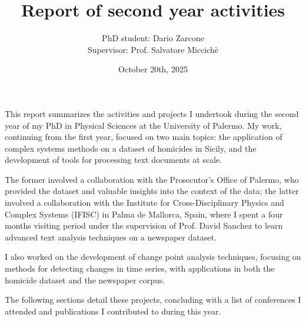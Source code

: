 \documentclass[a4paper, 10pt]{scrartcl}
\title{\LARGE{Report of second year activities}}
\author{\large{PhD student: Dario Zarcone}\\\large{Supervisor: Prof. Salvatore Miccichè}}
\date{\normalsize{October 20th, 2025}}
\begin{document}
\maketitle

This report summarizes the activities and projects I undertook during the second year of my PhD in Physical Sciences at the University of Palermo. My work, continuing from the first year, focused on two main topics: the application of complex systems methods on a dataset of homicides in Sicily, and the development of tools for processing text documents at scale.

The former involved a collaboration with the Prosecutor's Office of Palermo, who provided the dataset and valuable insights into the context of the data; the latter involved a collaboration with the Institute for Cross-Disciplinary Physics and Complex Systems (IFISC) in Palma de Mallorca, Spain, where I spent a four months visiting period under the supervision of Prof. David Sanchez to learn advanced text analysis techniques on a newspaper dataset.

I also worked on the development of change point analysis techniques, focusing on methods for detecting changes in time series, with applications in both the homicide dataset and the newspaper corpus.

The following sections detail these projects, concluding with a list of conferences I attended and publications I contributed to during this year.






\pagebreak

\printbibliography
\end{document}
